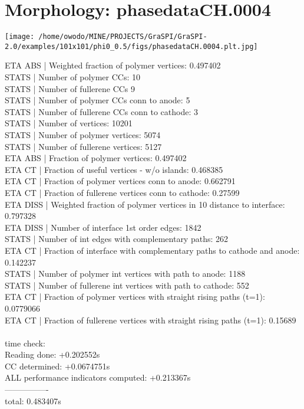 \documentclass{article}
\begin{document}
\section{Morphology: phasedataCH.0004 }
\begin{small}
\begin{center}\texttt{[image: /home/owodo/MINE/PROJECTS/GraSPI/GraSPI-2.0/examples/101x101/phi0\_0.5/figs/phasedataCH.0004.plt.jpg]} \end{center}
ETA ABS |  Weighted fraction of polymer vertices: 0.497402\\
STATS |  Number of polymer CCs: 10\\
STATS |  Number of fullerene CCs 9\\
STATS |  Number of polymer CCs conn to anode: 5\\
STATS |  Number of fullerene CCs conn to cathode: 3\\
STATS |  Number of vertices: 10201\\
STATS |  Number of polymer vertices: 5074\\
STATS |  Number of fullerene vertices: 5127\\
ETA ABS |  Fraction of polymer vertices: 0.497402\\
ETA CT |  Fraction of useful vertices - w/o islands: 0.468385\\
ETA CT |  Fraction of polymer vertices conn to anode: 0.662791\\
ETA CT |  Fraction of fullerene vertices conn to cathode: 0.27599\\
ETA DISS |  Weighted fraction of polymer vertices in 10 distance to interface: 0.797328\\
ETA DISS |  Number of interface 1st order edges: 1842\\
STATS |  Number of int edges with complementary paths: 262\\
ETA CT |  Fraction of interface with complementary paths to cathode and anode: 0.142237\\
STATS |  Number of polymer int vertices with path to anode: 1188\\
STATS |  Number of fullerene int vertices with path to cathode: 552\\
ETA CT |  Fraction of polymer vertices with straight rising paths (t=1): 0.0779066\\
ETA CT |  Fraction of fullerene vertices with straight rising paths (t=1): 0.15689\\
\\
 time check:\\
Reading done: +0.202552s\\
CC determined: +0.0674751s\\
ALL performance indicators computed: +0.213367s\\
----------------\\
total: 0.483407s\\

\end{small}
\end{document}
